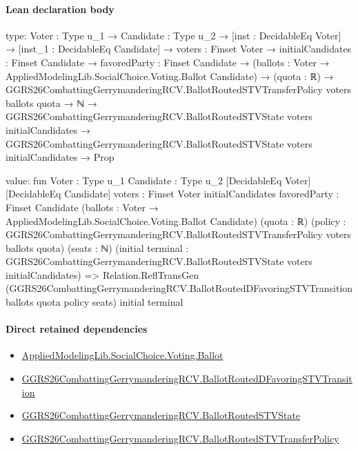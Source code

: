 \documentclass[10pt]{article}
\begin{document}
\paragraph{Lean declaration body}
\begin{ReviewVerbatim}
type:
{Voter : Type u_1} →
  {Candidate : Type u_2} →
    [inst : DecidableEq Voter] →
      [inst_1 : DecidableEq Candidate] →
        {voters : Finset Voter} →
          {initialCandidates : Finset Candidate} →
            {favoredParty : Finset Candidate} →
              (ballots : Voter → AppliedModelingLib.SocialChoice.Voting.Ballot Candidate) →
                (quota : ℝ) →
                  GGRS26CombattingGerrymanderingRCV.BallotRoutedSTVTransferPolicy voters ballots quota →
                    ℕ →
                      GGRS26CombattingGerrymanderingRCV.BallotRoutedSTVState voters initialCandidates →
                        GGRS26CombattingGerrymanderingRCV.BallotRoutedSTVState voters initialCandidates → Prop

value:
fun {Voter : Type u_1} {Candidate : Type u_2} [DecidableEq Voter] [DecidableEq Candidate] {voters : Finset Voter}
    {initialCandidates favoredParty : Finset Candidate}
    (ballots : Voter → AppliedModelingLib.SocialChoice.Voting.Ballot Candidate) (quota : ℝ)
    (policy : GGRS26CombattingGerrymanderingRCV.BallotRoutedSTVTransferPolicy voters ballots quota) (seats : ℕ)
    (initial terminal : GGRS26CombattingGerrymanderingRCV.BallotRoutedSTVState voters initialCandidates) =>
  Relation.ReflTransGen
    (GGRS26CombattingGerrymanderingRCV.BallotRoutedDFavoringSTVTransition ballots quota policy seats) initial terminal
\end{ReviewVerbatim}

\paragraph{Direct retained dependencies}
\begin{itemize}\raggedright
\item \hyperlink{governing-declaration-4c0320b08e4fb484}{Applied\allowbreak{}Modeling\allowbreak{}Lib.\allowbreak{}Social\allowbreak{}Choice.\allowbreak{}Voting.\allowbreak{}Ballot}
\item \hyperlink{governing-declaration-4dcbe128f2b022b3}{GGRS26\allowbreak{}Combatting\allowbreak{}Gerrymandering\allowbreak{}RCV.\allowbreak{}Ballot\allowbreak{}Routed\allowbreak{}D\allowbreak{}Favoring\allowbreak{}STV\allowbreak{}Transition}
\item \hyperlink{governing-declaration-8b872df78d871e1b}{GGRS26\allowbreak{}Combatting\allowbreak{}Gerrymandering\allowbreak{}RCV.\allowbreak{}Ballot\allowbreak{}Routed\allowbreak{}STV\allowbreak{}State}
\item \hyperlink{governing-declaration-9554b7918969e197}{GGRS26\allowbreak{}Combatting\allowbreak{}Gerrymandering\allowbreak{}RCV.\allowbreak{}Ballot\allowbreak{}Routed\allowbreak{}STV\allowbreak{}Transfer\allowbreak{}Policy}
\end{itemize}
\hypertarget{governing-declaration-3a02b26960fad588}{}
\end{document}
